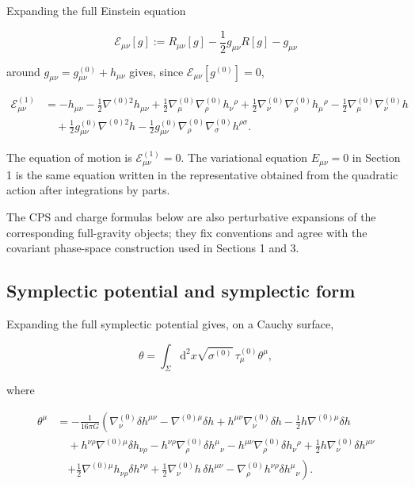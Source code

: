 Expanding the full Einstein equation

\[
\mathcal{E}_{\mu\nu}[g]:=R_{\mu\nu}[g]-\frac{1}{2}g_{\mu\nu}R[g]-g_{\mu\nu}
\]

around \(g_{\mu\nu}=g^{(0)}_{\mu\nu}+h_{\mu\nu}\) gives, since \(\mathcal{E}_{\mu\nu}[g^{(0)}]=0\),

\begin{align}
\mathcal{E}^{(1)}_{\mu\nu}&=-h_{\mu\nu}-\frac{1}{2}\nabla^{(0)2}h_{\mu\nu}+\frac{1}{2}\nabla^{(0)}_\mu\nabla^{(0)}_\rho h_\nu{}^\rho+\frac{1}{2}\nabla^{(0)}_\nu\nabla^{(0)}_\rho h_\mu{}^\rho-\frac{1}{2}\nabla^{(0)}_\mu\nabla^{(0)}_\nu h\\
&\quad+\frac{1}{2}g^{(0)}_{\mu\nu}\nabla^{(0)2}h-\frac{1}{2}g^{(0)}_{\mu\nu}\nabla^{(0)}_\rho\nabla^{(0)}_\sigma h^{\rho\sigma}.
\end{align}

The equation of motion is \(\mathcal{E}^{(1)}_{\mu\nu}=0\). The variational equation \(E_{\mu\nu}=0\) in Section 1 is the same equation written in the representative obtained from the quadratic action after integrations by parts.

The CPS and charge formulas below are also perturbative expansions of the corresponding full-gravity objects; they fix conventions and agree with the covariant phase-space construction used in Sections 1 and 3.

\subsection{Symplectic potential and symplectic form}\label{symplectic-potential-and-symplectic-form}

Expanding the full symplectic potential gives, on a Cauchy surface,

\[
\theta=\int_\Sigma \mathrm{d}^2x\sqrt{\sigma^{(0)}}\,\tau^{(0)}_\mu\theta^\mu ,
\]

where

\begin{align}
\theta^\mu&=-\frac{1}{16\pi G}\left(\nabla^{(0)}_\nu\delta h^{\mu\nu}-\nabla^{(0)\mu}\delta h+h^{\mu\nu}\nabla^{(0)}_\nu\delta h-\frac{1}{2}h\nabla^{(0)\mu}\delta h\right.\\
&\quad+h^{\nu\rho}\nabla^{(0)\mu}\delta h_{\nu\rho}-h^{\nu\rho}\nabla^{(0)}_\rho\delta h^\mu{}_\nu-h^{\mu\nu}\nabla^{(0)}_\rho\delta h_\nu{}^\rho+\frac{1}{2}h\nabla^{(0)}_\nu\delta h^{\mu\nu}\\
&\quad\left.+\frac{1}{2}\nabla^{(0)\mu}h_{\nu\rho}\delta h^{\nu\rho}+\frac{1}{2}\nabla^{(0)}_\nu h\,\delta h^{\mu\nu}-\nabla^{(0)}_\rho h^{\nu\rho}\delta h^\mu{}_\nu\right).
\end{align}

